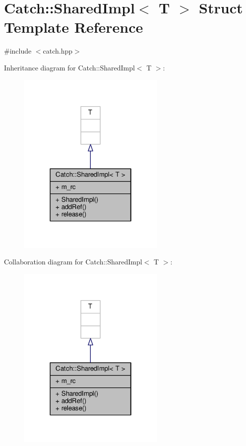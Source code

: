 \hypertarget{struct_catch_1_1_shared_impl}{\section{Catch\-:\-:Shared\-Impl$<$ T $>$ Struct Template Reference}
\label{struct_catch_1_1_shared_impl}
}


{\ttfamily \#include $<$catch.\-hpp$>$}



Inheritance diagram for Catch\-:\-:Shared\-Impl$<$ T $>$\-:
\nopagebreak
\begin{figure}[H]
\begin{center}
\leavevmode
\includegraphics[width=202pt]{struct_catch_1_1_shared_impl__inherit__graph}
\end{center}
\end{figure}


Collaboration diagram for Catch\-:\-:Shared\-Impl$<$ T $>$\-:
\nopagebreak
\begin{figure}[H]
\begin{center}
\leavevmode
\includegraphics[width=202pt]{struct_catch_1_1_shared_impl__coll__graph}
\end{center}
\end{figure}
